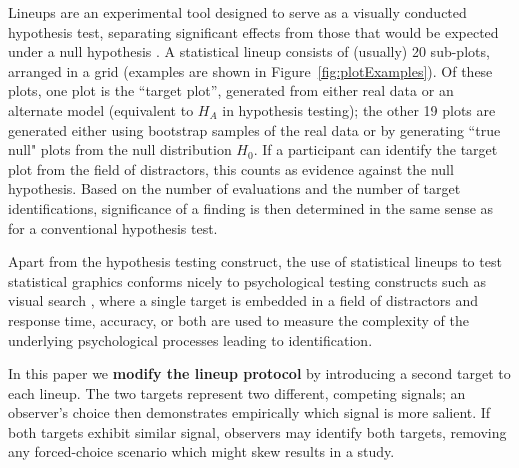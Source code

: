 \documentclass[12pt]{article}\usepackage[]{graphicx}\usepackage[]{color}
\newcommand{\comment}[2][inline]{\todo[color=SkyBlue, #1]{#2}} %
\begin{document}
Lineups are an experimental tool designed to serve as a visually conducted hypothesis test, separating significant effects from those that would be expected under a null hypothesis \citep{buja2009statistical, majumder2013validation,hofmann2012graphical, wickham2010graphical}. 
A statistical lineup consists of (usually) 20 sub-plots, arranged in a grid (examples are shown in Figure~\ref{fig:plotExamples}). 
Of these plots, one plot is the ``target plot'', generated from either real data or an alternate model (equivalent to $H_A$ in hypothesis testing); the other 19 plots are generated either using bootstrap samples of the real data or by generating ``true null" plots from the null distribution $H_0$. 
If a participant can identify the target plot from the field of distractors, this counts as evidence against the null hypothesis. Based on the number of evaluations and the number of target identifications, significance of a finding is then determined in the same sense as for a conventional hypothesis test. 

Apart from the hypothesis testing construct, the use of statistical lineups to test statistical graphics conforms nicely to psychological testing constructs such as visual search \citep{demita1981validity,treisman1980feature}, where a single target is embedded in a field of distractors and response time, accuracy, or both are used to measure the complexity of the underlying psychological processes leading to identification. 


In this paper we {\bf modify the lineup protocol} by introducing a second target to each lineup. The two targets represent two different, competing signals; an observer's choice then demonstrates empirically which signal is more salient. 
If both targets exhibit similar signal, observers may identify both targets, removing any forced-choice scenario which might skew results in a study. %

\end{document}
